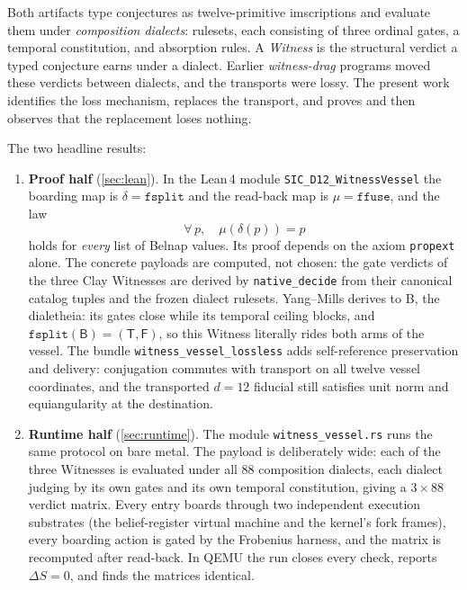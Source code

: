 \documentclass[12pt,a4paper]{article}
\newcommand{\Lean}{\textsf{Lean}\,4}
\newcommand{\bT}{\textsf{T}}
\newcommand{\bF}{\textsf{F}}
\newcommand{\bB}{\textsf{B}}
\begin{document}
Both artifacts type conjectures as twelve-primitive imscriptions and evaluate
them under \emph{composition dialects}: rulesets, each consisting of three
ordinal gates, a temporal constitution, and absorption rules.  A \emph{Witness}
is the structural verdict a typed conjecture earns under a dialect.  Earlier
\emph{witness-drag} programs moved these verdicts between dialects, and the
transports were lossy.  The present work identifies the loss mechanism, replaces
the transport, and proves and then observes that the replacement loses nothing.

The two headline results:

\begin{enumerate}
\item \textbf{Proof half} (\cref{sec:lean}).  In the \Lean{} module
\texttt{SIC\_D12\_WitnessVessel} the boarding map is
$\delta = \texttt{fsplit}$ and the read-back map is $\mu = \texttt{ffuse}$, and
the law
\[
\forall\, p,\quad \mu(\delta(p)) = p
\]
holds for \emph{every} list of Belnap values.  Its proof depends on the axiom
\texttt{propext} alone.  The concrete payloads are computed, not chosen: the gate
verdicts of the three Clay Witnesses are derived by \texttt{native\_decide} from
their canonical catalog tuples and the frozen dialect rulesets.  Yang--Mills
derives to \bB{}, the dialetheia: its gates close while its temporal ceiling
blocks, and $\texttt{fsplit}(\bB) = (\bT, \bF)$, so this Witness literally rides
both arms of the vessel.  The bundle \texttt{witness\_vessel\_lossless} adds
self-reference preservation and delivery: conjugation commutes with transport on
all twelve vessel coordinates, and the transported $d=12$ fiducial still satisfies
unit norm and equiangularity at the destination.

\item \textbf{Runtime half} (\cref{sec:runtime}).  The module
\texttt{witness\_vessel.rs} runs the same protocol on bare metal.  The payload is
deliberately wide: each of the three Witnesses is evaluated under all $88$
composition dialects, each dialect judging by its own gates and its own temporal
constitution, giving a $3 \times 88$ verdict matrix.  Every entry boards through
two independent execution substrates (the belief-register virtual machine and the
kernel's fork frames), every boarding action is gated by the Frobenius harness,
and the matrix is recomputed after read-back.  In QEMU the run closes every
check, reports $\Delta S = 0$, and finds the matrices identical.
\end{enumerate}
\end{document}
